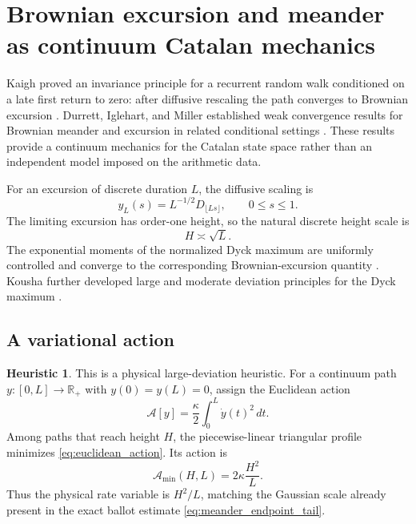 \documentclass[11pt]{amsart}
\numberwithin{equation}{section}
\theoremstyle{plain}
\theoremstyle{definition}
\newtheorem{heuristic}[theorem]{Heuristic}
\theoremstyle{remark}
\newcommand{\R}{\mathbb{R}}
\begin{document}
\section{Brownian excursion and meander as continuum Catalan mechanics}
\label{sec:brownian_mechanics}

Kaigh proved an invariance principle for a recurrent random walk conditioned on a late first return to zero: after diffusive rescaling the path converges to Brownian excursion \cite{Kaigh1976}.  Durrett, Iglehart, and Miller established weak convergence results for Brownian meander and excursion in related conditional settings \cite{DurrettIglehartMiller1977}.  These results provide a continuum mechanics for the Catalan state space rather than an independent model imposed on the arithmetic data.

For an excursion of discrete duration $L$, the diffusive scaling is
\begin{equation}
y_L(s)=L^{-1/2}D_{\lfloor Ls\rfloor},
\qquad 0\le s\le1.
\label{eq:diffusive_excursion_scaling}
\end{equation}
The limiting excursion has order-one height, so the natural discrete height scale is
\begin{equation}
H\asymp \sqrt L.
\label{eq:brownian_height_scale}
\end{equation}
The exponential moments of the normalized Dyck maximum are uniformly controlled and converge to the corresponding Brownian-excursion quantity \cite{KhorunzhiyMarckert2009}.  Kousha further developed large and moderate deviation principles for the Dyck maximum \cite{Kousha2012}.

\subsection{A variational action}
\label{subsec:variational_action}

\begin{heuristic}
\label{heur:brownian_action}
This is a physical large-deviation heuristic.  For a continuum path $y:[0,L]\to\R_+$ with $y(0)=y(L)=0$, assign the Euclidean action
\begin{equation}
\mathcal{A}[y]
=
\frac{\kappa}{2}
\int_0^L \dot y(t)^2\,dt.
\label{eq:euclidean_action}
\end{equation}
Among paths that reach height $H$, the piecewise-linear triangular profile minimizes \eqref{eq:euclidean_action}.  Its action is
\begin{equation}
\mathcal{A}_{\min}(H,L)
=
2\kappa\frac{H^2}{L}.
\label{eq:triangular_action}
\end{equation}
Thus the physical rate variable is $H^2/L$, matching the Gaussian scale already present in the exact ballot estimate \eqref{eq:meander_endpoint_tail}.
\end{heuristic}
\end{document}
